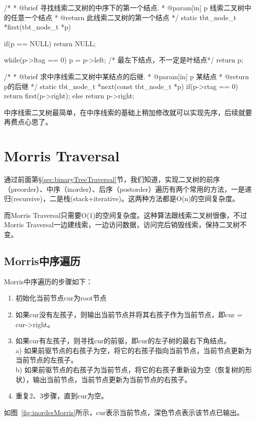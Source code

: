 \begin{Codex}[label=theaded_binary_tree.c]
 /*
  * @brief 寻找线索二叉树的中序下的第一个结点.
  * @param[in] p 线索二叉树中的任意一个结点
  * @return 此线索二叉树的第一个结点
  */
static tbt_node_t *first(tbt_node_t *p) {
    if(p == NULL)  return NULL;

    while(p->ltag == 0) {
        p = p->left;  /* 最左下结点，不一定是叶结点*/
    }
    return p;
}

 /*
  * @brief 求中序线索二叉树中某结点的后继.
  * @param[in] p 某结点
  * @return p的后继
  */
static tbt_node_t *next(const tbt_node_t *p) {
    if(p->rtag == 0) {
        return first(p->right);
    } else {
        return p->right;
    }
}
\end{Codex}

中序线索二叉树最简单，在中序线索的基础上稍加修改就可以实现先序，后续就要再费点心思了。


\section{Morris Traversal} %
通过前面第\S \ref{sec:binaryTreeTraversal}节，我们知道，实现二叉树的前序（preorder）、中序（inorder）、后序（postorder）遍历有两个常用的方法，一是递归(recursive)，二是栈(stack+iterative)。这两种方法都是O(n)的空间复杂度。

而Morris Traversal只需要O(1)的空间复杂度。这种算法跟线索二叉树很像，不过Morris Traversal一边建线索，一边访问数据，访问完后销毁线索，保持二叉树不变。

\subsection{Morris中序遍历}
Morris中序遍历的步骤如下：
\begin{enumerate}
\item 初始化当前节点cur为root节点
\item 如果cur没有左孩子，则输出当前节点并将其右孩子作为当前节点，即cur = cur->right。
\item 如果cur有左孩子，则寻找cur的前驱，即cur的左子树的最右下角结点。\\
   a) 如果前驱节点的右孩子为空，将它的右孩子指向当前节点，当前节点更新为当前节点的左孩子。\\
   b) 如果前驱节点的右孩子为当前节点，将它的右孩子重新设为空（恢复树的形状），输出当前节点，当前节点更新为当前节点的右孩子。
\item 重复2、3步骤，直到cur为空。
\end{enumerate}
如图~\ref{fig:inorderMorris}所示，cur表示当前节点，深色节点表示该节点已输出。

